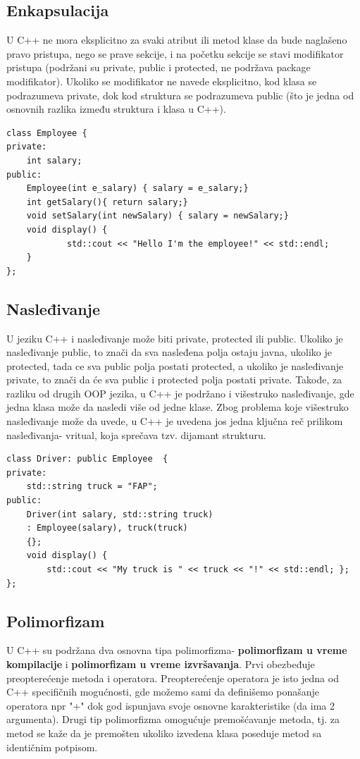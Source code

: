 \documentclass[a4paper]{article}
\begin{document}
\subsection{Enkapsulacija}
\label{subsec:c++Enkapsulacija}
U C++ ne mora eksplicitno za svaki atribut ili metod klase da bude naglašeno pravo pristupa, nego se prave sekcije, i na početku sekcije se stavi modifikator pristupa (podržani su private, public i protected, ne podržava package modifikator). Ukoliko se modifikator ne navede eksplicitno, kod klasa se podrazumeva private, dok kod struktura se podrazumeva public (što je jedna od osnovnih razlika između struktura i klasa u C++).
\begin{lstlisting}[caption={Primer deklarisanja klase sa enkapsulacijom},frame=single, label=lst:c++Deklaracija]
class Employee {
private:
	int salary;
public: 
	Employee(int e_salary) { salary = e_salary;}
	int getSalary(){ return salary;}
	void setSalary(int newSalary) { salary = newSalary;}
	void display() {
     		std::cout << "Hello I'm the employee!" << std::endl;
	}
};
\end{lstlisting}
\subsection{Nasleđivanje}
\label{subsec:c++Nasledjivanje}
U jeziku C++ i nasleđivanje može biti private, protected ili public. Ukoliko je nasleđivanje public, to znači da sva nasleđena polja ostaju javna, ukoliko je protected, tada ce sva public polja postati protected, a ukoliko je nasleđivanje private, to znači da će sva public i protected polja postati private. Takođe, za razliku od drugih OOP jezika, u C++ je podržano i višestruko nasleđivanje, gde jedna klasa može da nasledi više od jedne klase. Zbog problema koje višestruko nasleđivanje može da uvede, u C++ je uvedena jos jedna ključna reč prilikom nasleđivanja- vritual, koja sprečava tzv. dijamant strukturu. 
\begin{lstlisting}[caption={Primer nasleđivanja klasa u C++},frame=single, label=lst:c++Nasledjivanje]
class Driver: public Employee  {
private:
  	std::string truck = "FAP";
public: 
   	Driver(int salary, std::string truck) 
	: Employee(salary), truck(truck) 
	{};
  	void display() {
		std::cout << "My truck is " << truck << "!" << std::endl; };
};
\end{lstlisting}
\subsection{Polimorfizam}
\label{subsec:c++Polimorfizam}
U C++ su podržana dva osnovna tipa polimorfizma- \textbf{polimorfizam u vreme kompilacije} i \textbf{polimorfizam u vreme izvršavanja}. Prvi obezbeđuje preopterećenje metoda i operatora. Preopterećenje operatora je isto jedna od C++ specifičnih mogućnosti, gde možemo sami da definišemo ponašanje operatora npr "+" dok god ispunjava svoje osnovne karakteristike (da ima 2 argumenta). Drugi tip polimorfizma omogućuje premošćavanje metoda, tj. za metod se kaže da je premošten ukoliko izvedena klasa poseduje metod sa identičnim potpisom. 
\end{document}
